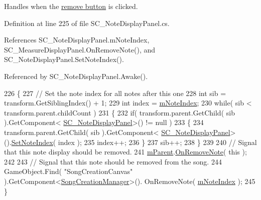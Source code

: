 Handles when the \hyperlink{group___s_c___n_d_p_priv_var_gac9af0bdc5b04a52ab9e7c13a0ad01ab7}{remove button} is clicked. 



Definition at line 225 of file S\+C\+\_\+\+Note\+Display\+Panel.\+cs.



References S\+C\+\_\+\+Note\+Display\+Panel.\+m\+Note\+Index, S\+C\+\_\+\+Measure\+Display\+Panel.\+On\+Remove\+Note(), and S\+C\+\_\+\+Note\+Display\+Panel.\+Set\+Note\+Index().



Referenced by S\+C\+\_\+\+Note\+Display\+Panel.\+Awake().


\begin{DoxyCode}
226     \{
227         \textcolor{comment}{// Set the note index for all notes after this one}
228         \textcolor{keywordtype}{int} sib = transform.GetSiblingIndex() + 1;
229         \textcolor{keywordtype}{int} index = \hyperlink{group___s_c___n_d_p_priv_var_ga11933919195aba904a4e8bf95f131e49}{mNoteIndex};
230         \textcolor{keywordflow}{while}( sib < transform.parent.childCount )
231         \{
232             \textcolor{keywordflow}{if}( transform.parent.GetChild( sib ).GetComponent<
      \hyperlink{class_s_c___note_display_panel}{SC\_NoteDisplayPanel}>() != null )
233             \{
234                 transform.parent.GetChild( sib ).GetComponent<
      \hyperlink{class_s_c___note_display_panel}{SC\_NoteDisplayPanel}>().\hyperlink{group___s_c___n_d_p_unity_gaf3160e3686e44e7718768242438ea1cc}{SetNoteIndex}( index );
235                 index++;
236             \}
237             sib++;
238         \}
239 
240         \textcolor{comment}{// Signal that this note display should be removed.}
241         \hyperlink{group___s_c___n_d_p_priv_var_ga360017747d9ed8910ddd4b3309477710}{mParent}.\hyperlink{group___s_c___m_d_p_handlers_gab48fa7fe4d7d4b29a3b0567be2b29849}{OnRemoveNote}( \textcolor{keyword}{this} );
242 
243         \textcolor{comment}{// Signal that this note should be removed from the song.}
244         GameObject.Find( \textcolor{stringliteral}{"SongCreationCanvas"} ).GetComponent<\hyperlink{class_song_creation_manager}{SongCreationManager}>().
      OnRemoveNote( \hyperlink{group___s_c___n_d_p_priv_var_ga11933919195aba904a4e8bf95f131e49}{mNoteIndex} );
245     \}
\end{DoxyCode}
\mbox{\label{group___s_c___n_d_p_handlers_ga7b25bcc6b76ae0894ac6eefde417caf1}} 
